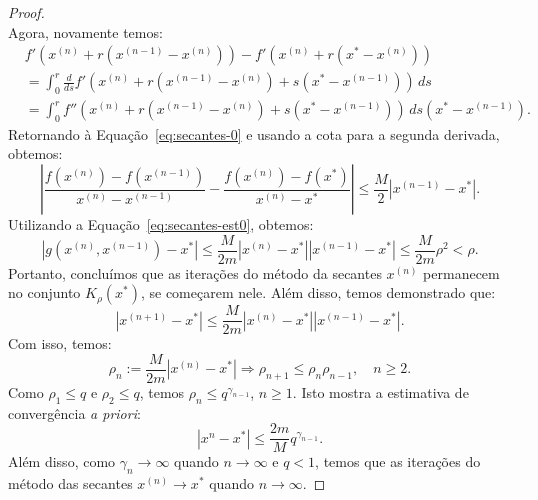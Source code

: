 \begin{proof}
\begin{equation}
\end{equation}
Agora, novamente temos:
\begin{equation}
  \begin{split}
  &f'(x^{(n)} + r(x^{(n-1)} - x^{(n)})) - f'(x^{(n)} + r(x^* - x^{(n)}))\\
  &= \int_0^r \frac{d}{ds}f'(x^{(n)} + r(x^{(n-1)} - x^{(n)}) + s(x^* - x^{(n-1)}))\,ds\\
  &= \int_0^r f''(x^{(n)} + r(x^{(n-1)} - x^{(n)}) + s(x^* - x^{(n-1)}))\,ds(x^* - x^{(n-1)}).
  \end{split}
\end{equation}
Retornando à Equação~\eqref{eq:secantes-0} e usando a cota para a segunda derivada, obtemos:
\begin{equation}
  \left|\frac{f(x^{(n)}) - f(x^{(n-1)})}{x^{(n)} - x^{(n-1)}} - \frac{f(x^{(n)}) - f(x^*)}{x^{(n)} - x^*} \right| \leq \frac{M}{2}|x^{(n-1)} - x^*|.
\end{equation}
Utilizando a Equação~\eqref{eq:secantes-est0}, obtemos:
\begin{equation}
  |g(x^{(n)},x^{(n-1)})-x^*| \leq \frac{M}{2m}|x^{(n)}-x^*||x^{(n-1)}-x^*| \leq \frac{M}{2m}\rho^2 < \rho.
\end{equation}
Portanto, concluímos que as iterações do método da secantes $x^{(n)}$ permanecem no conjunto $K_\rho(x^*)$, se começarem nele. Além disso, temos demonstrado que:
\begin{equation}
  |x^{(n+1)} - x^*| \leq \frac{M}{2m}|x^{(n)} - x^*||x^{(n-1)} - x^*|.
\end{equation}
Com isso, temos:
\begin{equation}
  \rho_n := \frac{M}{2m}|x^{(n)} - x^*| \Rightarrow \rho_{n+1} \leq \rho_{n}\rho_{n-1},\quad n\geq 2.
\end{equation}
Como $\rho_1 \leq q$ e $\rho_2 \leq q$, temos $\rho_n \leq q^{\gamma_{n-1}}$, $n\geq 1$. Isto mostra a estimativa de convergência \emph{a priori}:
\begin{equation}
  |x^{n} - x^*| \leq \frac{2m}{M}q^{\gamma_{n-1}}.
\end{equation}
Além disso, como $\gamma_{n}\to \infty$ quando $n\to\infty$ e $q < 1$, temos que as iterações do método das secantes $x^{(n)}\to x^*$ quando $n\to \infty$.


\end{proof}
